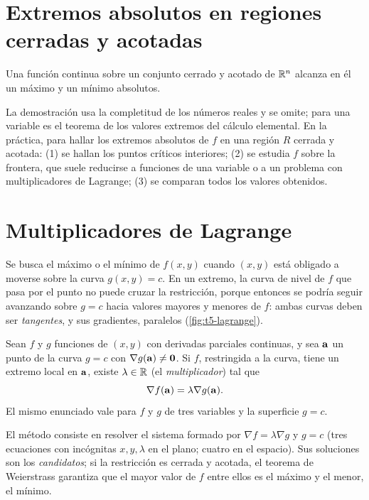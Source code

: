 \addtocounter{definicion}{1}%

\section{Extremos absolutos en regiones cerradas y acotadas}

\begin{teorema}[Weierstrass]\label{teo:weierstrass}
Una función continua sobre un conjunto cerrado y acotado de $\mathbb{R}^n$ alcanza en él un máximo y un mínimo absolutos.
\end{teorema}

La demostración usa la completitud de los números reales y se omite; para una variable es el teorema de los valores extremos del cálculo elemental. En la práctica, para hallar los extremos absolutos de $f$ en una región $R$ cerrada y acotada: (1) se hallan los puntos críticos interiores; (2) se estudia $f$ sobre la frontera, que suele reducirse a funciones de una variable o a un problema con multiplicadores de Lagrange; (3) se comparan todos los valores obtenidos.

\addtocounter{definicion}{1}%

\section{Multiplicadores de Lagrange}

Se busca el máximo o el mínimo de $f(x,y)$ cuando $(x,y)$ está obligado a moverse sobre la curva $g(x,y)=c$. En un extremo, la curva de nivel de $f$ que pasa por el punto no puede cruzar la restricción, porque entonces se podría seguir avanzando sobre $g=c$ hacia valores mayores y menores de $f$: ambas curvas deben ser \emph{tangentes}, y sus gradientes, paralelos (\cref{fig:t5-lagrange}).

\addtocounter{figure}{1}%

\begin{teorema}\label{teo:lagrange}
Sean $f$ y $g$ funciones de $(x,y)$ con derivadas parciales continuas, y sea $\mathbf{a}$ un punto de la curva $g=c$ con $\nabla g(\mathbf{a})\neq\mathbf{0}$. Si $f$, restringida a la curva, tiene un extremo local en $\mathbf{a}$, existe $\lambda\in\mathbb{R}$ (el \emph{multiplicador}) tal que
\[
\nabla f(\mathbf{a})=\lambda\nabla g(\mathbf{a}).
\]
El mismo enunciado vale para $f$ y $g$ de tres variables y la superficie $g=c$.
\end{teorema}

El método consiste en resolver el sistema formado por $\nabla f=\lambda\nabla g$ y $g=c$ (tres ecuaciones con incógnitas $x,y,\lambda$ en el plano; cuatro en el espacio). Sus soluciones son los \emph{candidatos}; si la restricción es cerrada y acotada, el teorema de Weierstrass garantiza que el mayor valor de $f$ entre ellos es el máximo y el menor, el mínimo.

\addtocounter{definicion}{1}%

\addtocounter{definicion}{1}%

\addtocounter{definicion}{1}%

\addtocounter{definicion}{1}%

